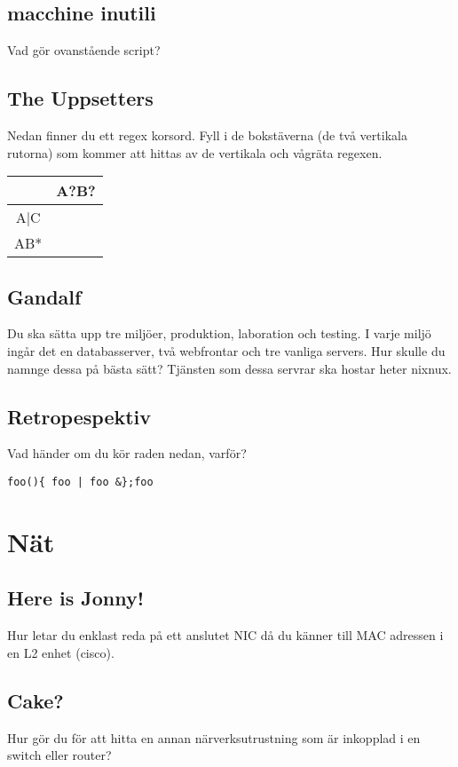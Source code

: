 \documentclass[a4paper]{report}
\begin{document}
\section{macchine inutili}
Vad gör ovanstående script?

\section{The Uppsetters}
Nedan finner du ett regex korsord. Fyll i de bokstäverna (de två vertikala rutorna) som kommer att hittas av de vertikala och vågräta regexen.
\newline
\begin{tabular}{| c | c |}
\hline
& A?B? \\ \hline
A|C & \\ \hline
AB* & \\ \hline
\end{tabular}

\section{Gandalf}
Du ska sätta upp tre miljöer, produktion, laboration och testing. I varje miljö ingår det en databasserver, två webfrontar och tre vanliga servers. 
Hur skulle du namnge dessa på bästa sätt?
Tjänsten som dessa servrar ska hostar heter nixnux.

\section{Retropespektiv}
Vad händer om du kör raden nedan, varför? 
\begin{verbatim}
foo(){ foo | foo &};foo
\end{verbatim}
\chapter{Nät}
\section{Here is Jonny!}
Hur letar du enklast reda på ett anslutet NIC då du känner till MAC adressen i en L2 enhet (cisco).

\section{Cake?}
Hur gör du för att hitta en annan närverksutrustning som är inkopplad i en switch eller router?
\end{document}
